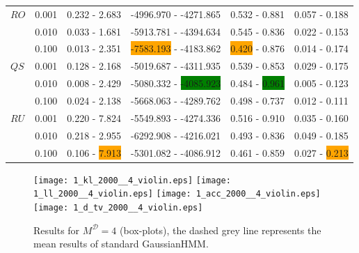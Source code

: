 \documentclass[shortabstract]{iithesis}
\begin{document}
\begin{table}[!ht]
\begin{tabular}{llllll}
$RO$ & 0.001 &  0.232 - 2.683 &   -4996.970 - -4271.865 &  0.532 - 0.881 &  0.057 - 0.188 \\
        & 0.010 &  0.033 - 1.681 &  -5913.781 - -4394.634 &  0.545 - 0.836 &  0.022 - 0.153 \\
        & 0.100 &  0.013 - 2.351 &  \colorbox{orange}{-7583.193} - -4183.862 &   \colorbox{orange}{0.420} - 0.876 &  0.014 - 0.174 \\
$QS$ & 0.001 &  0.128 - 2.168 &  -5019.687 - -4311.935 &  0.539 - 0.853 &  0.029 - 0.175 \\
        & 0.010 &  0.008 - 2.429 &  -5080.332 - \colorbox{green}{-4085.923} &  0.484 - \colorbox{green}{0.961} &  0.005 - 0.123 \\
        & 0.100 &  0.024 - 2.138 &  -5668.063 - -4289.762 &  0.498 - 0.737 &  0.012 - 0.111 \\
$RU$& 0.001 &   0.220 - 7.824 &  -5549.893 - -4274.336 &   0.516 - 0.910 &   0.035 - 0.160 \\
        & 0.010 &  0.218 - 2.955 &  -6292.908 - -4216.021 &  0.493 - 0.836 &  0.049 - 0.185 \\
        & 0.100 &  0.106 - \colorbox{orange}{7.913} &  -5301.082 - -4086.912 &  0.461 - 0.859 &  0.027 - \colorbox{orange}{0.213} \\
\hline
\end{tabular}
\label{tab:res_ex1_4}
\end{table}

\newpage

\begin{figure}[!ht] 
    \centering
    \texttt{[image: 1\_kl\_2000\_\_4\_violin.eps]}
    \texttt{[image: 1\_ll\_2000\_\_4\_violin.eps]}
    \texttt{[image: 1\_acc\_2000\_\_4\_violin.eps]}
    \texttt{[image: 1\_d\_tv\_2000\_\_4\_violin.eps]}
    \caption{Results for $M^{\mathcal D}=4$ (box-plots), the dashed grey line represents the mean results of standard GaussianHMM.}
    \label{fig:res_ex1_4}
\end{figure}

\pagebreak
\end{document}
